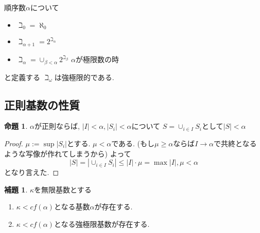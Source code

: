 \documentclass[dvipdfmx,a4paper,11pt]{report}
\theoremstyle{definition}
\newtheorem{lem}[thm]{補題}
\newtheorem{prop}[thm]{命題}
\newtheorem{rem}[thm]{注意}
\begin{document}
順序数$\alpha$について

\begin{itemize}
\item $\beth_0 = \aleph_0$
\item $\beth_{\alpha+1}= 2^{\beth_{\alpha}}$
\item $\beth_{\alpha}= \cup_{\beta < \alpha }2^{\beth_{\beta}}$ $\alpha$が極限数の時
\end{itemize}
と定義する
$\beth_{\omega}$は強極限的である. 




\subsection{正則基数の性質}

 \begin{tcolorbox}
 [colback = white, colframe = green!35!black, fonttitle = \bfseries,breakable = true]
\begin{prop}
\label{prop-regular-cardinal}
$\alpha$が正則ならば, $| I | <  \alpha, |S_i| < \alpha$について
$ S = \cup_{i \in I}S_i$として$|S| < \alpha$
\end{prop}
\end{tcolorbox}
\begin{proof}
$\mu := \sup |S_{i}|$とする.
$\mu < \alpha$である.
(もし$\mu \ge \alpha$ならば$I \to \alpha$で共終となるような写像が作れてしまうから)
よって
$$
|S| =
 |\cup_{i \in I}S_i |
 \le 
 | I | \cdot {\mu}
= \max {|I|, \mu}
< \alpha
$$
となり言えた. 
\end{proof}




 \begin{tcolorbox}
 [colback = white, colframe = green!35!black, fonttitle = \bfseries,breakable = true]
\begin{lem}\cite[000E 3.7 Cofinality]{Sta}
\label{lem-cofinal}
$\kappa$を無限基数とする
\begin{enumerate}
\item $\kappa < cf(\alpha)$となる基数$\alpha$が存在する.
\item $\kappa < cf(\alpha)$となる強極限基数が存在する.
\end{enumerate}
\end{lem}
 \end{tcolorbox}
 
\end{document}
